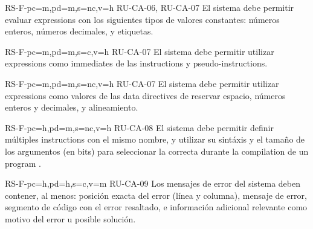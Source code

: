 \begin{softwareReq}{RS-F-}{pc=m,pd=m,s=nc,v=h}
    {RU-CA-06, RU-CA-07}
    El sistema debe permitir evaluar \glspl{expression} con los siguientes tipos
    de valores constantes: números enteros, números decimales, y etiquetas.
\end{softwareReq}

\begin{softwareReq}{RS-F-}{pc=m,pd=m,s=c,v=h}
    {RU-CA-07}
    El sistema debe permitir utilizar \glspl{expression} como \glspl{immediate}
    de las \glspl{instruction} y \glspl{pseudo-instruction}.
\end{softwareReq}

\begin{softwareReq}{RS-F-}{pc=m,pd=m,s=nc,v=h}
    {RU-CA-07}
    El sistema debe permitir utilizar \glspl{expression} como valores de las
    \glspl{data directive} de reservar espacio, números enteros y decimales, y
    alineamiento.
\end{softwareReq}

\begin{softwareReq}{RS-F-}{pc=h,pd=m,s=nc,v=h}
    {RU-CA-08}
    El sistema debe permitir definir múltiples \glspl{instruction} con el mismo
    nombre, y utilizar su sintáxis y el tamaño de los argumentos (en bits) para
    seleccionar la correcta durante la \gls{compilation} de un \gls{program}
    .
\end{softwareReq}

\begin{softwareReq}{RS-F-}{pc=h,pd=h,s=c,v=m}
    {RU-CA-09}
    Los mensajes de error del sistema deben contener, al menos: posición exacta
    del error (línea y columna), mensaje de error, segmento de código con el
    error resaltado, e información adicional relevante como motivo del error u
    posible solución.
\end{softwareReq}



